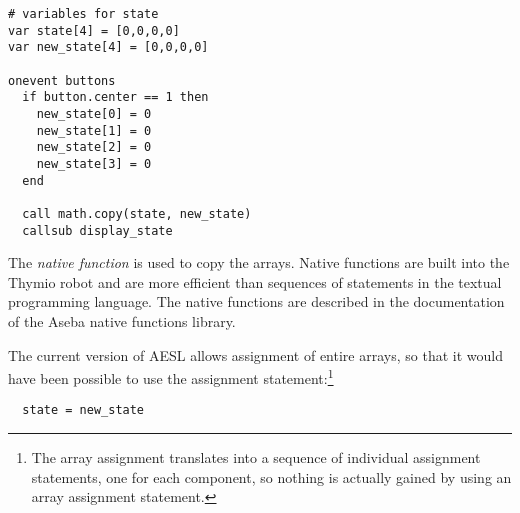 \begin{footnotesize}
\begin{verbatim}
# variables for state
var state[4] = [0,0,0,0]
var new_state[4] = [0,0,0,0]

onevent buttons
  if button.center == 1 then
    new_state[0] = 0
    new_state[1] = 0
    new_state[2] = 0
    new_state[3] = 0
  end

  call math.copy(state, new_state)
  callsub display_state
\end{verbatim}
\end{footnotesize}

The \emph{native function}  is used to copy the arrays.
Native functions are built into the Thymio robot and are more efficient
than sequences of statements in the textual programming language. The
native functions are described in the documentation of the
Aseba native functions library.

The current version of AESL allows assignment of entire arrays, so that
it would have been possible to use the assignment
statement:\footnote{The array assignment translates into a sequence of
individual assignment statements, one for each component, so nothing is
actually gained by using an array assignment statement.}

\begin{footnotesize}
\begin{verbatim}
  state = new_state
\end{verbatim}
\end{footnotesize}
